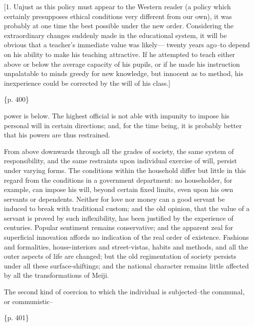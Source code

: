 [1. Unjust as this policy must appear to the Western reader (a policy which certainly presupposes ethical conditions very different from our own), it was probably at one time the best possible under the new order. Considering the extraordinary changes suddenly made in the educational system, it will be obvious that a teacher's immediate value was likely--- twenty years ago--to depend on his ability to make his teaching attractive. If he attempted to teach either above or below the average capacity of his pupils, or if he made his instruction unpalatable to minds greedy for new knowledge, but innocent as to method, his inexperience could be corrected by the will of his class.]

\{p. 400\}

power is below. The highest official is not able with impunity to impose his personal will in certain directions; and, for the time being, it is probably better that his powers are thus restrained.

From above downwards through all the grades of society, the same system of responsibility, and the same restraints upon individual exercise of will, persist under varying forms. The conditions within the household differ but little in this regard from the conditions in a government department: no householder, for example, can impose his will, beyond certain fixed limits, even upon his own servants or dependents. Neither for love nor money can a good servant be induced to break with traditional custom; and the old opinion, that the value of a servant is proved by such inflexibility, has been justified by the experience of centuries. Popular sentiment remains conservative; and the apparent zeal for superficial innovation affords no indication of the real order of existence. Fashions and formalities, house-interiors and street-vistas, habits and methods, and all the outer aspects of life are changed; but the old regimentation of society persists under all these surface-shiftings; and the national character remains little affected by all the transformations of Meiji.



The second kind of coercion to which the individual is subjected--the communal, or communistic--

\{p. 401\}

